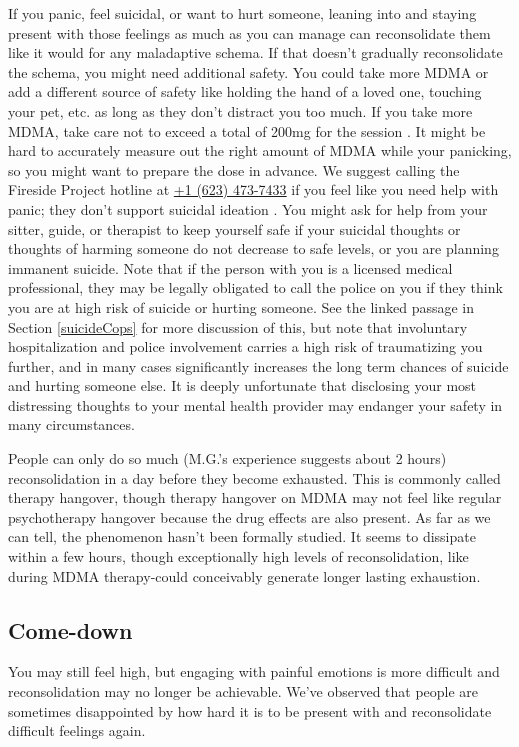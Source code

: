 \documentclass[12pt,letterpaper]{book}
\begin{document}
If you panic, feel suicidal, or want to hurt someone, leaning into and staying present with those feelings as much as you can manage can reconsolidate them like it would for any maladaptive schema. If that doesn't gradually reconsolidate the schema, you might need additional safety. You could take more MDMA or add a different source of safety like holding the hand of a loved one, touching your pet, etc. as long as they don't distract you too much. If you take more MDMA, take care not to exceed a total of 200mg for the session \cite{liechtiInteractions}. It might be hard to accurately measure out the right amount of MDMA while your panicking, so you might want to prepare the dose in advance. We suggest calling the Fireside Project hotline at \href{tel:1-623-473-7433}{+1 (623) 473-7433} if you feel like you need help with panic; they don't support suicidal ideation \cite{firesideProject}. You might ask for help from your sitter, guide, or therapist to keep yourself safe if your suicidal thoughts or thoughts of harming someone do not decrease to safe levels, or you are planning immanent suicide. Note that if the person with you is a licensed medical professional, they may be legally obligated to call the police on you if they think you are at high risk of suicide or hurting someone. See the linked passage in Section \ref{suicideCops} for more discussion of this, but note that involuntary hospitalization and police involvement carries a high risk of traumatizing you further, and in many cases significantly increases the long term chances of suicide and hurting someone else. It is deeply unfortunate that disclosing your most distressing thoughts to your mental health provider may endanger your safety in many circumstances.

People can only do so much (M.G.'s experience suggests about 2 hours) reconsolidation in a day before they become exhausted. This is commonly called therapy hangover, though therapy hangover on MDMA may not feel like regular psychotherapy hangover because the drug effects are also present. As far as we can tell, the phenomenon hasn't been formally studied. It seems to dissipate within a few hours, though exceptionally high levels of reconsolidation, like during MDMA therapy-could conceivably generate longer lasting exhaustion.

\subsection*{Come-down} You may still feel high, but engaging with painful emotions is more difficult and reconsolidation may no longer be achievable. We've observed that people are sometimes disappointed by how hard it is to be present with and reconsolidate difficult feelings again.
\end{document}
